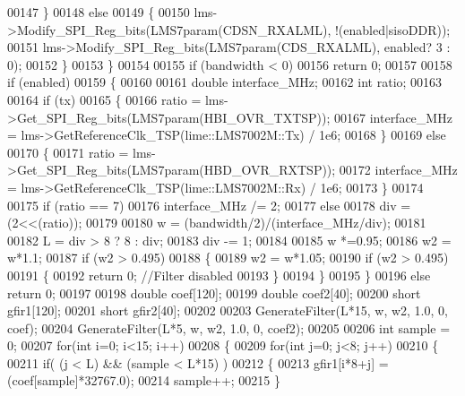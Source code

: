 \begin{DoxyCode}
00147         \}
00148         \textcolor{keywordflow}{else}
00149         \{
00150             lms->Modify_SPI_Reg_bits(LMS7param(CDSN_RXALML), !(enabled|sisoDDR));
00151             lms->Modify_SPI_Reg_bits(LMS7param(CDS_RXALML),  enabled? 3 : 0);
00152         \}
00153     \}
00154 
00155     \textcolor{keywordflow}{if} (bandwidth < 0)
00156         \textcolor{keywordflow}{return} 0;
00157 
00158     \textcolor{keywordflow}{if} (enabled)
00159     \{
00160 
00161         \textcolor{keywordtype}{double} interface\_MHz;
00162         \textcolor{keywordtype}{int} ratio;
00163 
00164         \textcolor{keywordflow}{if} (tx)
00165         \{
00166             ratio = lms->Get_SPI_Reg_bits(LMS7param(HBI_OVR_TXTSP));
00167             interface\_MHz = lms->GetReferenceClk_TSP(lime::LMS7002M::Tx) / 1e6;
00168         \}
00169         \textcolor{keywordflow}{else}
00170         \{
00171             ratio = lms->Get_SPI_Reg_bits(LMS7param(HBD_OVR_RXTSP));
00172             interface\_MHz = lms->GetReferenceClk_TSP(lime::LMS7002M::Rx) / 1e6;
00173         \}
00174 
00175         \textcolor{keywordflow}{if} (ratio == 7)
00176             interface\_MHz /= 2;
00177         \textcolor{keywordflow}{else}
00178             div = (2<<(ratio));
00179 
00180         w = (bandwidth/2)/(interface\_MHz/div);
00181 
00182         L = div > 8 ? 8 : div;
00183         div -= 1;
00184 
00185         w *=0.95;
00186         w2 = w*1.1;
00187         \textcolor{keywordflow}{if} (w2 > 0.495)
00188         \{
00189          w2 = w*1.05;
00190          \textcolor{keywordflow}{if} (w2 > 0.495)
00191          \{
00192              \textcolor{keywordflow}{return} 0; \textcolor{comment}{//Filter disabled}
00193          \}
00194         \}
00195     \}
00196     \textcolor{keywordflow}{else} \textcolor{keywordflow}{return} 0;
00197 
00198   \textcolor{keywordtype}{double} coef[120];
00199   \textcolor{keywordtype}{double} coef2[40];
00200   \textcolor{keywordtype}{short} gfir1[120];
00201   \textcolor{keywordtype}{short} gfir2[40];
00202 
00203   GenerateFilter(L*15, w, w2, 1.0, 0, coef);
00204   GenerateFilter(L*5, w, w2, 1.0, 0, coef2);
00205 
00206     \textcolor{keywordtype}{int} sample = 0;
00207     \textcolor{keywordflow}{for}(\textcolor{keywordtype}{int} i=0; i<15; i++)
00208     \{
00209     \textcolor{keywordflow}{for}(\textcolor{keywordtype}{int} j=0; j<8; j++)
00210         \{
00211             \textcolor{keywordflow}{if}( (j < L) && (sample < L*15) )
00212             \{
00213                 gfir1[i*8+j] = (coef[sample]*32767.0);
00214         sample++;
00215             \}

\end{DoxyCode}

